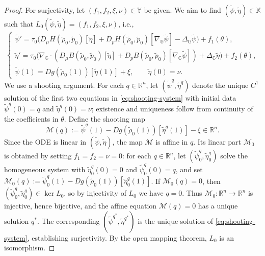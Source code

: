 \documentclass[10pt]{article}
\numberwithin{equation}{section}
\newcommand{\R}{\mathbb R}
\def\R{{\mathbb{R}}}
\def\G{\mathbb{G}}
\begin{document}
\begin{proof}
For surjectivity, let $(f_1, f_2, \xi, \nu) \in \mathbb Y$ be given. We aim to find $(\tilde\psi,\tilde\eta) \in \mathbb{X}$ such that $L_0(\tilde\psi, \tilde\eta) = (f_1, f_2, \xi, \nu)$, i.e.,
\begin{equation}\label{eq:shooting-system}
\begin{cases}
\tilde\psi' = \tau_0\big(D_\mu H(\tilde\rho_0, \tilde p_0)[\tilde\eta] + D_p H(\tilde\rho_0, \tilde p_0)[\nabla_\G \tilde\psi] - \Delta_\G \tilde\psi\big) + f_1(\theta), \\
\tilde\eta' = \tau_0\big(\nabla_\G \cdot (D_\mu B(\tilde\rho_0, \tilde p_0)[\tilde\eta] + D_p B(\tilde\rho_0, \tilde p_0)[\nabla_\G \tilde\psi]) + \Delta_\G \tilde\eta\big) + f_2(\theta), \\
\tilde\psi(1) = Dg(\tilde\rho_0(1))[\tilde\eta(1)] + \xi, \qquad \tilde\eta(0) = \nu.
\end{cases}
\end{equation}
We use a shooting argument. For each $q \in \R^n$, let $(\tilde\psi^q, \tilde\eta^q)$ denote the unique $C^1$ solution of the first two equations in \eqref{eq:shooting-system} with initial data $\tilde\psi^q(0) = q$ and $\tilde\eta^q(0) = \nu$; existence and uniqueness follow from continuity of the coefficients in $\theta$. Define the shooting map
\[
\mathcal{M}(q) := \tilde\psi^q(1) - Dg(\tilde\rho_0(1))[\tilde\eta^q(1)] - \xi \in \R^n.
\]
Since the ODE is linear in $(\tilde\psi, \tilde\eta)$, the map $\mathcal{M}$ is affine in $q$. Its linear part $\mathcal{M}_0$ is obtained by setting $f_1 = f_2 = \nu = 0$: for each $q \in \R^n$, let $(\tilde\psi^q_0, \tilde\eta^q_0)$ solve the homogeneous system with $\tilde\eta^q_0(0) = 0$ and $\tilde\psi^q_0(0) = q$, and set $\mathcal{M}_0(q) := \tilde\psi^q_0(1) - Dg(\tilde\rho_0(1))[\tilde\eta^q_0(1)]$. If $\mathcal{M}_0(q) = 0$, then $(\tilde\psi^q_0, \tilde\eta^q_0) \in \ker L_0$, so by injectivity of $L_0$ we have $q = 0$. Thus $\mathcal{M}_0 : \R^n \to \R^n$ is injective, hence bijective, and the affine equation $\mathcal{M}(q) = 0$ has a unique solution $q^*$. The corresponding $(\tilde\psi^{q^*}, \tilde\eta^{q^*})$ is the unique solution of \eqref{eq:shooting-system}, establishing surjectivity. By the open mapping theorem, $L_0$ is an isomorphism.


\end{proof}
\end{document}
